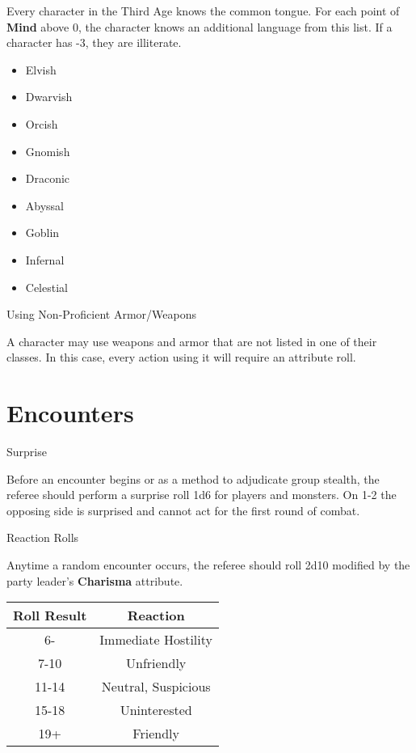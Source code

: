 Every character in the Third Age knows the common tongue. For each point of \textbf{Mind} above 0, the character knows an additional language from this list. If a character has -3, they are illiterate. 
\begin{itemize}
\setlength\itemsep{0em}
	\item Elvish
	\item Dwarvish
	\item Orcish
	\item Gnomish
	\item Draconic
	\item Abyssal
	\item Goblin
	\item Infernal
	\item Celestial
\end{itemize}

\begin{mercHeading}
Using Non-Proficient Armor/Weapons
\end{mercHeading}
A character may use weapons and armor that are not listed in one of their classes. In this case, every action using it will require an attribute roll.
\section*{Encounters}%
\begin{mercHeading}
Surprise
\end{mercHeading}

Before an encounter begins or as a method to adjudicate group stealth, the referee should perform a surprise roll 1d6 for players and monsters. On 1-2 the opposing side is surprised and cannot act for the first round of combat.

\begin{mercHeading}
Reaction Rolls
\end{mercHeading}
Anytime a random encounter occurs, the referee should roll 2d10 modified by the party leader's \textbf{Charisma} attribute.%
\begin{table}[H]

\begin{center}
\Large
{}
\begin{tabular}{ c  c  }


\textbf{
Roll Result} &\textbf{ Reaction}\\
\bottomrule
\bottomrule

6- & Immediate Hostility \\

7-10 &  Unfriendly\\

11-14 & Neutral, Suspicious \\

15-18 & Uninterested \\

19+ & Friendly \\


\end{tabular}
\end{center}
\label{table:RollingAttributes}
\vspace{-1cm}
\end{table}


